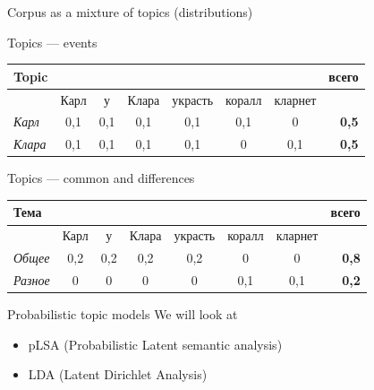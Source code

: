 \documentclass[svgnames]{beamer}
\begin{document}
    \begin{frame}{Corpus as a mixture of topics (distributions)}
        \footnotesize
        \begin{block}{Topics — events}
            \begin{tabular}[c]{lccccccr}
                Topic          &      &     &       &         &           &           & всего        \\
                \hline
                & Карл & у   & Клара & украсть & коралл    & кларнет   &              \\
                \textit{Карл}  & 0,1  & 0,1 & 0,1   & 0,1     & 0,1       & \alert{0} & \textbf{0,5} \\
                \textit{Клара} & 0,1  & 0,1 & 0,1   & 0,1     & \alert{0} & 0,1       & \textbf{0,5} \\
            \end{tabular}
        \end{block}

        \begin{block}{Topics — common and differences}
            \begin{tabular}[c]{lccccccr}
                Тема            &      &     &       &         &        &         & всего        \\
                \hline
                & Карл & у   & Клара & украсть & коралл & кларнет &              \\
                \textit{Общее}  & 0,2  & 0,2 & 0,2   & 0,2     & 0      & 0       & \textbf{0,8} \\
                \textit{Разное} & 0    & 0   & 0     & 0       & 0,1    & 0,1     & \textbf{0,2} \\
            \end{tabular}
        \end{block}
    \end{frame}

    \begin{frame}{Probabilistic topic models}
        We will look at
        \begin{itemize}
            \item pLSA (Probabilistic Latent semantic analysis)
            \item LDA (Latent Dirichlet Analysis)
        \end{itemize}
    \end{frame}
\end{document}
